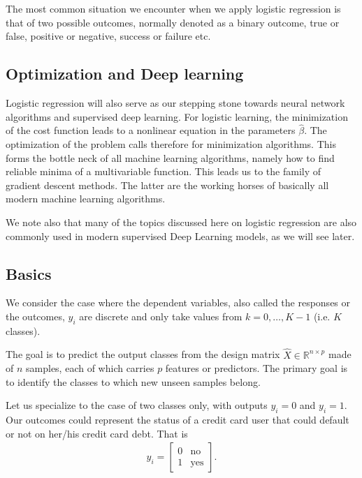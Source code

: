 \documentclass[letterpaper,10pt,english]{sphinxmanual}
\begin{document}
The most common situation we encounter when we apply logistic
regression is that of two possible outcomes, normally denoted as a
binary outcome, true or false, positive or negative, success or
failure etc.


\subsection{Optimization and Deep learning}
\label{\detokenize{chapter5:optimization-and-deep-learning}}
Logistic regression will also serve as our stepping stone towards
neural network algorithms and supervised deep learning. For logistic
learning, the minimization of the cost function leads to a non\sphinxhyphen{}linear
equation in the parameters \(\hat{\beta}\). The optimization of the
problem calls therefore for minimization algorithms. This forms the
bottle neck of all machine learning algorithms, namely how to find
reliable minima of a multi\sphinxhyphen{}variable function. This leads us to the
family of gradient descent methods. The latter are the working horses
of basically all modern machine learning algorithms.

We note also that many of the topics discussed here on logistic
regression are also commonly used in modern supervised Deep Learning
models, as we will see later.




\subsection{Basics}
\label{\detokenize{chapter5:basics}}
We consider the case where the dependent variables, also called the
responses or the outcomes, \(y_i\) are discrete and only take values
from \(k=0,\dots,K-1\) (i.e. \(K\) classes).

The goal is to predict the
output classes from the design matrix \(\hat{X}\in\mathbb{R}^{n\times p}\)
made of \(n\) samples, each of which carries \(p\) features or predictors. The
primary goal is to identify the classes to which new unseen samples
belong.

Let us specialize to the case of two classes only, with outputs
\(y_i=0\) and \(y_i=1\). Our outcomes could represent the status of a
credit card user that could default or not on her/his credit card
debt. That is
\begin{equation*}
\begin{split}
y_i = \begin{bmatrix} 0 & \mathrm{no}\\  1 & \mathrm{yes} \end{bmatrix}.
\end{split}
\end{equation*}
\end{document}

